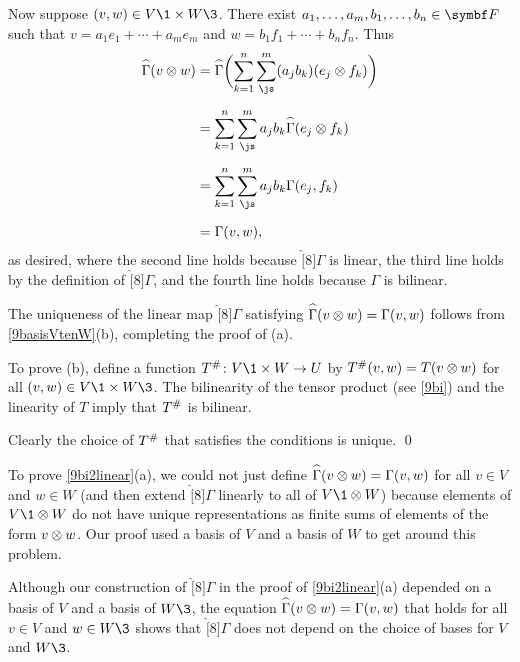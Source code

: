 Now suppose $(v, w) \in V\1 \times W\3$. There exist $a_1, \ldots, a_m, b_1, \ldots, b_n \in \F{}$ such that
$
v = a_1 e_1 + \cdots + a_m e_m$ and $w = b_1 f_1 + \cdots + b_n f_n$.
Thus
\begin{align*}
\hat[8]{\Gamma}(v \tensor w) &= \hat[8]{\Gamma} \paren[\bigg]{ \sum_{k=1}^n \sum_{\js}^m  (a_j b_k) (e_j \tensor f_k) } \\[6bp]
&= \sum_{k=1}^n \sum_{\js}^m a_j b_k \hat[8]{\Gamma}(e_j \tensor f_k) \\[6bp]
&= \sum_{k=1}^n \sum_{\js}^m a_j b_k \Gamma(e_j , f_k) \\[6bp]
&= \Gamma(v, w),
\end{align*}
as desired, where the second line holds because $\hat[8]{\Gamma}$ is linear, the third line holds by the definition of $\hat[8]{\Gamma}$, and the fourth line holds because $\Gamma$ is bilinear.

The uniqueness of the linear map $\hat[8]{\Gamma}$ satisfying $\hat[8]{\Gamma}(v \tensor w) = \Gamma(v, w)$ follows from \ref{9basisVtenW}(b), completing the proof of (a).

To prove (b), define a function $\fun {\pound{T}} {V\1 \times W} U$ by ${T}^{\#}(v, w) = T(v \otimes w)$ for all $(v, w) \in V\1 \times W\3$. The bilinearity of the tensor product (see \ref{9bi}) and the linearity of $T$ imply that ${T}^{\#}$ is bilinear.

Clearly the choice of ${T}^{\#}$ that satisfies the conditions is unique.
\qed

To prove \ref{9bi2linear}(a), we could not just define $\hat[8]{\Gamma}(v \tensor w) = \Gamma(v, w)$ for all $v \in V$ and $w \in W$ \big(and then extend $\hat[8]{\Gamma}$ linearly to all of $V\1 \tensor W$\big) because elements of $V\1 \tensor W$ do not have unique representations as finite sums of elements of the form $v \otimes w$. Our proof used a basis of $V$ and a basis of $W$ to get around this problem.

Although our construction of $\hat[8]{\Gamma}$ in the proof of \ref{9bi2linear}(a) depended on a basis of $V$ and a basis of $W\3$, the equation $\hat[8]{\Gamma}(v \tensor w) = \Gamma(v, w)$ that holds for all $v \in V$ and $w \in W\3$ shows that $\hat[8]{\Gamma}$ does not depend on the choice of bases for $V$ and $W\3$.

